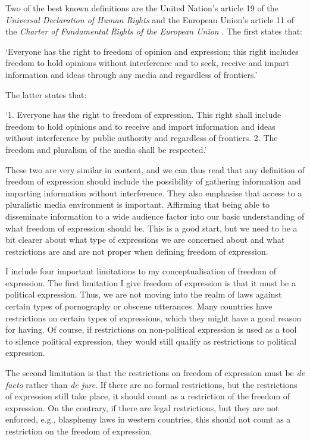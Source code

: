 Two of the best known definitions are the United Nation's article 19 of the \textit{Universal Declaration of Human Rights} \citeyearpar{un_general_assembly_universal_1948} and the European Union's article 11 of the \textit{Charter of Fundamental Rights of the European Union} \citeyearpar{european_parliament_charter_2012}. The first states that:
\begin{displayquote}
`Everyone has the right to freedom of opinion and expression; this right includes freedom to hold opinions without interference and to seek, receive and impart information and ideas through any media and regardless of frontiers.' \citep{un_general_assembly_universal_1948}
\end{displayquote}
The latter states that:
\begin{displayquote}
`1. Everyone has the right to freedom of expression. This right shall include freedom to hold opinions and to receive and impart information and ideas without interference by public authority and regardless of frontiers.
2. The freedom and pluralism of the media shall be respected.' \citep{european_parliament_charter_2012}
\end{displayquote}
These two are very similar in content, and we can thus read that any definition of freedom of expression should include the possibility of gathering information and imparting information without interference. They also emphasise that access to a pluralistic media environment is important. Affirming that being able to disseminate information to a wide audience factor into our basic understanding of what freedom of expression should be. This is a good start, but we need to be a bit clearer about what type of expressions we are concerned about and what restrictions are and are not proper when defining freedom of expression. 

I include four important limitations to my conceptualisation of freedom of expression. The first limitation I give freedom of expression is that it must be a political expression. Thus, we are not moving into the realm of laws against certain types of pornography \citep[pp. 6-7]{bonotti_freedom_2021} or obscene utterances. Many countries have restrictions on certain types of expressions, which they might have a good reason for having. Of course, if restrictions on non-political expression is used as a tool to silence political expression, they would still qualify as restrictions to political expression.

The second limitation is that the restrictions on freedom of expression must be \textit{de facto} rather than \textit{de jure}. If there are no formal restrictions, but the restrictions of expression still take place, it should count as a restriction of the freedom of expression. On the contrary, if there are legal restrictions, but they are not enforced, e.g., blasphemy laws in western countries, this should not count as a restriction on the freedom of expression. 

